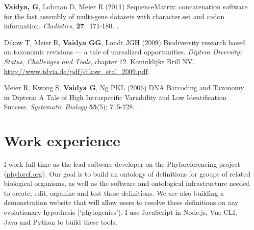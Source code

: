\documentclass[12pt,letter]{article}
\begin{document}
\begin{publications}



\item \textbf{Vaidya, G}, Lohman D, Meier R (2011) SequenceMatrix: concatenation software for the fast assembly of multi-gene datasets with character set and codon information. \textit{Cladistics}, \textbf{27}:~171-180. .

\item Dikow T, Meier R, \textbf{Vaidya GG}, Londt JGH (2009) Biodiversity research based on taxonomic revisions --- a tale of unrealized opportunities. \textit{Diptera Diversity: Status, Challenges and Tools}, chapter 12. Koninklijke Brill NV. \url{http://www.tdvia.de/pdf/dikow_etal_2009.pdf}.

\item Meier R, Kwong S, \textbf{Vaidya G}, Ng PKL (2006) DNA Barcoding and Taxonomy in Diptera: A Tale of High Intraspecific Variability and Low Identification Success. \textit{Systematic Biology} \textbf{55}(5): 715-728. .

\end{publications}


\part{Work experience}


I work full-time as the lead software developer on the Phyloreferencing project (\href{http://phyloref.org}{phyloref.org}). Our goal is to build an ontology of definitions for groups of related biological organisms, as well as the software and ontological infrastructure needed to create, edit, organize and test these definitions. We are also building a demonstration website that will allow users to resolve these definitions on any evolutionary hypothesis (`phylogenies'). I use JavaScript in Node.js, Vue CLI, Java and Python to build these tools.
\end{document}
